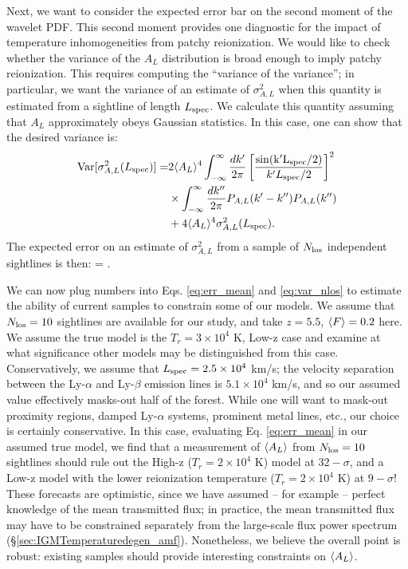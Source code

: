 Next, we want to consider the expected error bar on the second moment of the wavelet PDF. This second moment provides one
diagnostic for the impact of temperature inhomogeneities from patchy reionization. We would like to check whether
the variance of the $A_L$ distribution is broad enough to imply patchy reionization. This requires computing the
``variance of the variance''; in particular, we want the variance of an estimate of $\sigma^2_{A,L}$ when this
quantity is estimated from a sightline of length $L_{\rm spec}$. We calculate this quantity assuming that $A_L$ approximately
obeys Gaussian statistics. In this case, one can show that the desired variance is:
\begin{align}
{\rm Var}[\sigma^2_{A,L}(L_{\rm spec})] =& 2 \langle A_L \rangle^4 \int_{-\infty}^{\infty} \frac{dk^\prime}{2 \pi} \left[\frac{\rm{sin}(k^\prime L_{\rm spec}/2)}{k^\prime L_{\rm spec}/2} \right]^2 \nonumber \\
& \times \int_{-\infty}^{\infty} \frac{dk^{\prime \prime}}{2 \pi} P_{A,L}(k^\prime - k^{\prime \prime}) P_{A,L}(k^{\prime \prime}) \nonumber \\
& + 4 \langle A_L \rangle^4 \sigma^2_{A,L}(L_{\rm spec}).
\label{eq:var_al}
\end{align}
The expected error on an estimate of $\sigma^2_{A,L}$ from a sample of $N_{\rm los}$ independent sightlines is then:
\beqa
{} =  .
\label{eq:var_nlos}
\eeqa

We can now plug numbers into Eqs. \ref{eq:err_mean} and \ref{eq:var_nlos} to estimate the ability of current samples to
constrain some of our models. We assume that $N_{\rm los} = 10$ sightlines are available for our study, and take $z=5.5$, $\langle F \rangle=0.2$ 
here. We assume the true model is the $T_r = 3 \times 10^4$ K, Low-z case and examine at what significance other models
may be distinguished from this case. Conservatively, we assume that $L_{\rm spec} = 2.5 \times 10^4$ km/s; the velocity separation
between the Ly-$\alpha$ and Ly-$\beta$ emission lines is $5.1 \times 10^4$ km/s, and so our assumed value effectively 
masks-out half of the forest. While one will want to mask-out proximity regions, damped Ly-$\alpha$ systems, prominent metal lines, etc., our choice is certainly conservative. In this case, evaluating Eq. \ref{eq:err_mean} in our assumed true model, we find that a measurement
of $\langle A_L \rangle$ from $N_{\rm los} = 10$ sightlines should rule out the High-z ($T_r = 2 \times 10^4$ K) model at $32-\sigma$, and
a Low-z model with the lower reionization temperature ($T_r = 2 \times 10^4$ K) at $9-\sigma$! These forecasts are  
optimistic, since
we have assumed -- for example -- perfect knowledge of the mean transmitted flux; in practice, the mean transmitted flux 
may have to be constrained separately from the
large-scale flux power spectrum (\S \ref{sec:IGMTemperaturedegen_amf}). Nonetheless, we believe the overall point is robust: existing samples should
provide interesting constraints on $\langle A_L \rangle$.

